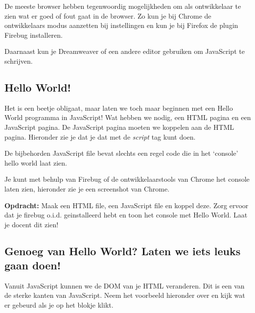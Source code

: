 \documentclass[a4paper]{report}
\begin{document}
De meeste browser hebben tegenwoordig mogelijkheden om als ontwikkelaar te zien wat er goed of fout gaat in de browser. Zo kun je bij Chrome de ontwikkelaars modus aanzetten bij instellingen en kun je bij Firefox de plugin Firebug installeren. 

Daarnaast kun je Dreamweaver of een andere editor gebruiken om JavaScript te schrijven.

\subsection*{Hello World!}
Het is een beetje obligaat, maar laten we toch maar beginnen met een Hello World programma in JavaScript! Wat hebben we nodig, een HTML pagina en een JavaScript pagina. De JavaScript pagina moeten we koppelen aan de HTML pagina. Hieronder zie je dat je dat met de \emph{script} tag kunt doen.



\noindent De bijbehorden JavaScript file bevat slechts een regel code die in het `console' hello world laat zien.



\noindent Je kunt met behulp van Firebug of de ontwikkelaarstools van Chrome het console laten zien, hieronder zie je een screenshot van Chrome.

\begin{center}
\end{center}

\noindent \textbf{Opdracht:} Maak een HTML file, een JavaScript file en koppel deze. Zorg ervoor dat je firebug o.i.d. geinstalleerd hebt en toon het console met Hello World. Laat je docent dit zien!

\subsection*{Genoeg van Hello World? Laten we iets leuks gaan doen!}
Vanuit JavaScript kunnen we de DOM van je HTML veranderen. Dit is een van de sterke kanten van JavaScript. Neem het voorbeeld hieronder over en kijk wat er gebeurd als je op het blokje klikt.
\end{document}
